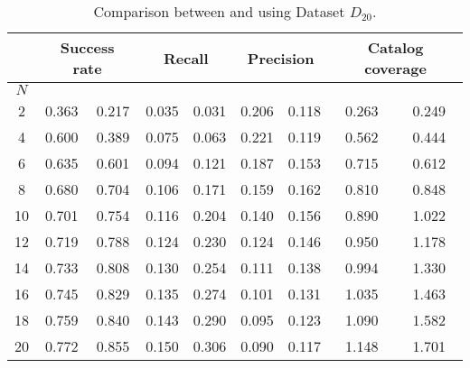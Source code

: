 \begin{table*}[t!]
	\normalsize
	\caption{Comparison between \MNB and \TFb using Dataset $D_{20}$.}
	\begin{tabular}{|c| c|c| c|c |c|c |c|c|} \hline		
		& \multicolumn{2}{c|}{\textbf{Success rate}} & \multicolumn{2}{c|}{\textbf{Recall}} & \multicolumn{2}{c|}{\textbf{Precision}} & \multicolumn{2}{c|}{ \textbf{Catalog coverage}} \\ \hline
		$N$  & \MNB     & \TF  & \MNB      & \TF   & \MNB       & \TF    & \MNB       & \TF      \\ \hline         
		
		2  & 0.363      & 0.217  & 0.035     & 0.031  & 0.206       & 0.118   & 0.263          & 0.249      \\ \hline		
4  & 0.600      & 0.389  & 0.075     & 0.063  & 0.221       & 0.119   & 0.562         & 0.444     \\ \hline
6  & 0.635      & 0.601  & 0.094     & 0.121  & 0.187       & 0.153   & 0.715         & 0.612     \\ \hline 
\rowcolor{Gray}
8  & 0.680      & 0.704  & 0.106      & 0.171  & 0.159        & 0.162   & 0.810       & 0.848     \\ \hline
10 & 0.701      & 0.754  & 0.116      & 0.204  & 0.140        & 0.156   & 0.890       & 1.022  \\ \hline		
12 & 0.719      & 0.788  & 0.124      & 0.230  & 0.124        & 0.146   & 0.950       & 1.178     \\ \hline		
14 & 0.733      & 0.808  & 0.130      & 0.254  & 0.111        & 0.138   & 0.994       & 1.330     \\ \hline		
16 & 0.745      & 0.829  & 0.135      & 0.274  &  0.101       & 0.131   & 1.035       & 1.463     \\ \hline		
18 & 0.759      & 0.840  & 0.143      & 0.290  & 0.095        & 0.123   & 1.090       & 1.582     \\ \hline
20 & 0.772      & 0.855 & 0.150       & 0.306  & 0.090        & 0.117   & 1.148       & 1.701    \\ \hline
	\end{tabular}
	\vspace{.2cm}
	\label{tab:combined_dt20}
\end{table*}